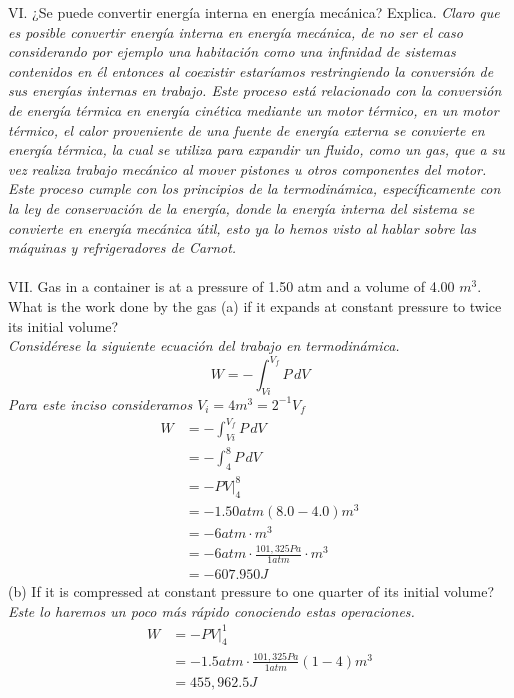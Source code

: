 \documentclass{article}
\begin{document}
VI. ¿Se puede convertir energía interna en energía mecánica? Explica.
\textit{Claro que es posible convertir energía interna en energía mecánica, de no ser el caso considerando por ejemplo una habitación como una infinidad de sistemas contenidos en él entonces al coexistir estaríamos restringiendo la conversión de sus energías internas en trabajo. Este proceso está relacionado con la conversión de energía térmica en energía cinética mediante un motor térmico, en un motor térmico, el calor proveniente de una fuente de energía externa se convierte en energía térmica, la cual se utiliza para expandir un fluido, como un gas, que a su vez realiza trabajo mecánico al mover pistones u otros componentes del motor. Este proceso cumple con los principios de la termodinámica, específicamente con la ley de conservación de la energía, donde la energía interna del sistema se convierte en energía mecánica útil, esto ya lo hemos visto al hablar sobre las máquinas y refrigeradores de Carnot.} \\\\

VII. Gas in a container is at a pressure of 1.50 atm and a volume of 4.00 $m^3$. What is the work done by the gas (a) if it expands at constant pressure to twice its initial volume? \\
\textit{Considérese la siguiente ecuación del trabajo en termodinámica.}
\begin{equation}
    W = -\int_{Vi}^{V_f} P \, dV
\end{equation}
\textit{Para este inciso consideramos $V_i=4m^3=2^{-1}V_f$}
 \begin{align*}
      W &= -\int_{Vi}^{V_f} P \, dV \\
      &= -\int_{4}^{8} P \, dV \\
      &= -PV \Big|_4^8 \\
      &= -1.50atm(8.0-4.0)m^3 \\
      &= -6atm \cdot m^3 \\
      &= -6atm\cdot \frac{101,325Pa}{1atm} \cdot m^3 \\
      &= -607.950 J
      \end{align*}
(b) If it is compressed at constant pressure to one quarter of its initial volume?\\
\textit{Este lo haremos un poco más rápido conociendo estas operaciones.}
\begin{align*}
    W &= -PV \Big|_4^1 \\
    &= -1.5atm\cdot \frac{101,325Pa}{1atm} (1-4)m^3 \\
    &= 455,962.5 J
\end{align*}
\end{document}
